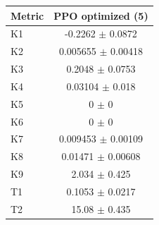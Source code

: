 \begin{tabular}{lc}
\toprule
Metric & PPO optimized (5) \\
\midrule
K1 & -0.2262 $\pm$ 0.0872 \\
K2 & 0.005655 $\pm$ 0.00418 \\
K3 & 0.2048 $\pm$ 0.0753 \\
K4 & 0.03104 $\pm$ 0.018 \\
K5 & 0 $\pm$ 0 \\
K6 & 0 $\pm$ 0 \\
K7 & 0.009453 $\pm$ 0.00109 \\
K8 & 0.01471 $\pm$ 0.00608 \\
K9 & 2.034 $\pm$ 0.425 \\
T1 & 0.1053 $\pm$ 0.0217 \\
T2 & 15.08 $\pm$ 0.435 \\
\bottomrule
\end{tabular}
